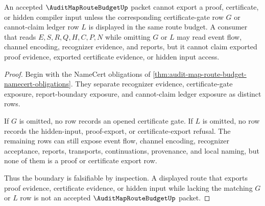 \begin{theorem}
\label{thm:audit-map-route-budget-falsifiable-boundary}
An accepted $\AuditMapRouteBudgetUp$ packet cannot export a proof, certificate, or hidden compiler input unless the corresponding certificate-gate row $G$ or cannot-claim ledger row $L$ is displayed in the same route budget. A consumer that reads $E,S,R,Q,H,C,P,N$ while omitting $G$ or $L$ may read event flow, channel encoding, recognizer evidence, and reports, but it cannot claim exported proof evidence, exported certificate evidence, or hidden input access.
\end{theorem}
\begin{proof}
Begin with the NameCert obligations of \autoref{thm:audit-map-route-budget-namecert-obligations}. They separate recognizer evidence, certificate-gate exposure, report-boundary exposure, and cannot-claim ledger exposure as distinct rows.

If $G$ is omitted, no row records an opened certificate gate. If $L$ is omitted, no row records the hidden-input, proof-export, or certificate-export refusal. The remaining rows can still expose event flow, channel encoding, recognizer acceptance, reports, transports, continuations, provenance, and local naming, but none of them is a proof or certificate export row.

Thus the boundary is falsifiable by inspection. A displayed route that exports proof evidence, certificate evidence, or hidden input while lacking the matching $G$ or $L$ row is not an accepted $\AuditMapRouteBudgetUp$ packet.
\end{proof}

